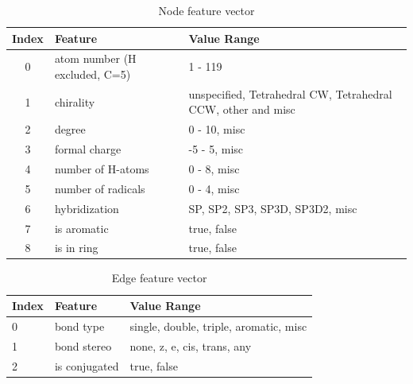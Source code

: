 \begin{table}
    \centering
    \caption{Node feature vector}
    \label{node_features}
    \begin{tabular}{c || l| p{6cm} |}
        Index & Feature                       & Value Range                                                  \\
        \hline
        \hline
        0     & atom number (H excluded, C=5) & 1 - 119                                                      \\
        1     & chirality                     & unspecified, Tetrahedral CW, Tetrahedral CCW, other and misc \\
        2     & degree                        & 0 - 10, misc                                                 \\
        3     & formal charge                 & -5 - 5, misc                                                 \\
        4     & number of H-atoms             & 0 - 8, misc                                                  \\
        5     & number of radicals            & 0 - 4, misc                                                  \\
        6     & hybridization                 & SP, SP2, SP3, SP3D, SP3D2, misc                              \\
        7     & is aromatic                   & true, false                                                  \\
        8     & is in ring                    & true, false                                                  \\
    \end{tabular}
\end{table}

\begin{table}
    \centering
    \caption{Edge feature vector}
    \label{edge_features}
    \begin{tabular}{l || l p{6cm} |}
        Index & Feature       & Value Range                            \\
        \hline
        \hline
        0     & bond type     & single, double, triple, aromatic, misc \\
        1     & bond stereo   & none, z, e, cis, trans, any            \\
        2     & is conjugated & true, false
    \end{tabular}
\end{table}


